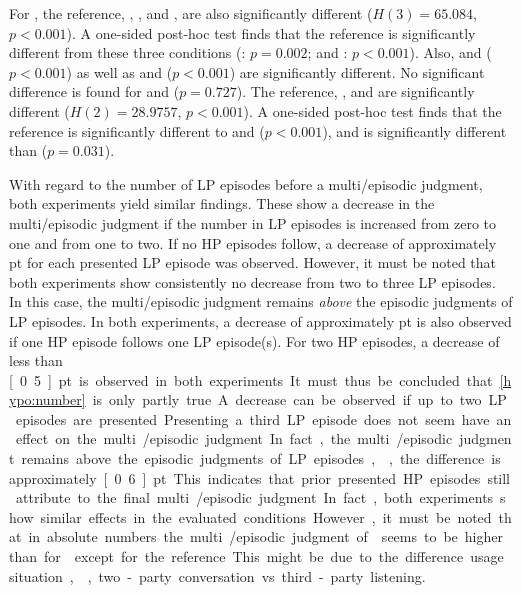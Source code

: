 For \EIIa{}, the reference, , \CVa{}, and , are also significantly different ($H(3)=65.084$, $p<0.001$).
A one-sided post-hoc test finds that the reference is significantly different from these three conditions (: $p=0.002$; \CVa{} and : $p<0.001$).
Also,  and \CVa{} ($p<0.001$) as well as  and  ($p<0.001$) are significantly different.
No significant difference is found for \CVa{} and  ($p=0.727$).
The reference, \CIIa{}, and  are significantly different ($H(2)=28.9757$, $p<0.001$).
A one-sided post-hoc test finds that the reference is significantly different to \CIIa{} and  ($p<0.001$), and \CIIa{} is significantly different than  ($p=0.031$).

With regard to the number of \ac{LP} episodes before a multi\-/episodic judgment, both experiments yield similar findings.
These show a decrease in the multi\-/episodic judgment if the number in \ac{LP} episodes is increased from zero to one and from one to two.
If no \ac{HP} episodes follow, a decrease of approximately \unit[1]{pt} for each presented \ac{LP} episode was observed.
However, it must be noted that both experiments show consistently no decrease from two to three \ac{LP} episodes.
In this case, the multi\-/episodic judgment remains \emph{above} the episodic judgments of \ac{LP} episodes.
In both experiments, a decrease of approximately \unit[1]{pt} is also observed if one \ac{HP} episode follows one \ac{LP} episode(s).
For two \ac{HP} episodes, a decrease of less than \unit[0.5]{pt} is observed in both experiments.

It must thus be concluded that \autoref{hypo:number} is only partly true.
A decrease can be observed if up to two \ac{LP} episodes are presented.
Presenting a third \ac{LP} episode does not seem have an effect on the multi\-/episodic judgment.
In fact, the multi\-/episodic judgment remains above the episodic judgments of \ac{LP} episodes, \ie, the difference is approximately~\unit[0.6]{pt}.
This indicates that prior presented \ac{HP} episodes still attribute to the final multi\-/episodic judgment.

In fact, both experiments show similar effects in the evaluated conditions.
However, it must be noted that in absolute numbers the multi\-/episodic judgment of \EIIa{} seems to be higher than for  except for the reference.
This might be due to the difference usage situation, \ie, two-party conversation vs. third-party listening.

